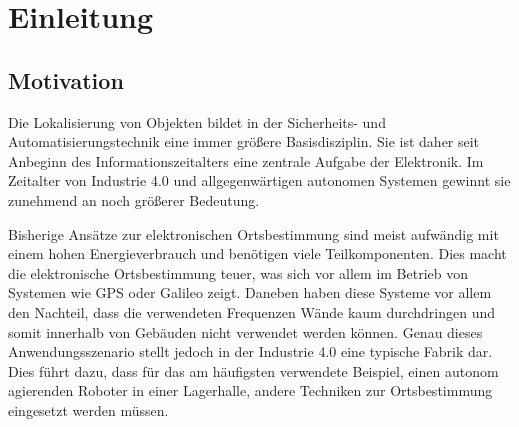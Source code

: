
\chapter{Einleitung}
\label{sec:Einleitung}
\pagestyle{scrheadings}



\section{Motivation}
Die Lokalisierung von Objekten bildet in der Sicherheits- und Automatisierungstechnik eine immer größere Basisdisziplin. Sie ist daher seit Anbeginn des Informationszeitalters eine zentrale Aufgabe der Elektronik. Im Zeitalter von Industrie 4.0 und allgegenwärtigen autonomen Systemen gewinnt sie zunehmend an noch größerer Bedeutung. 

Bisherige Ansätze zur elektronischen Ortsbestimmung sind meist aufwändig mit einem hohen Energieverbrauch und benötigen viele Teilkomponenten. Dies macht die elektronische Ortsbestimmung teuer, was sich vor allem im Betrieb von Systemen wie GPS oder Galileo zeigt. Daneben haben diese Systeme vor allem den Nachteil, dass die verwendeten Frequenzen Wände kaum durchdringen und somit innerhalb von Gebäuden nicht verwendet werden können. Genau dieses Anwendungsszenario stellt jedoch in der Industrie 4.0 eine typische Fabrik dar. Dies führt dazu, dass für das am häufigsten verwendete Beispiel, einen autonom agierenden Roboter in einer Lagerhalle, andere Techniken zur Ortsbestimmung eingesetzt werden müssen. 

